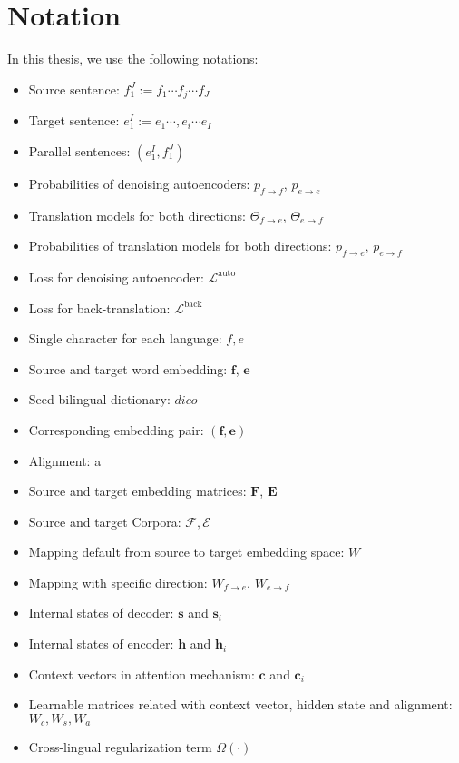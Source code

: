 \section{Notation}
In this thesis, we use the following notations:
\begin{itemize}
	\item Source sentence:  ${f_1^J:= f_1 \cdots  f_j \cdots f_J}$ 
	\item Target sentence:  ${e_1^I:= e_1 \cdots, e_i \cdots e_I}$
	\item Parallel sentences: $(e_1^I, f_1^J)$
	\item Probabilities of denoising autoencoders: $p_{f\rightarrow f}$, $p_{e\rightarrow e}$
	\item Translation models for both directions: $\Theta_{f\rightarrow e}$, $\Theta_{e \rightarrow f}$
	\item Probabilities of translation models for both directions: $p_{f\rightarrow e}$, $p_{e\rightarrow f}$
	\item Loss for denoising autoencoder: $\mathcal{L}^{\text{auto}}$
	\item Loss for back-translation: $\mathcal{L}^{\text{back}}$
	\item Single character for each language: $f,e$ 
	\item Source and target word embedding: $\bm{f}$, $\bm{e}$
	\item Seed bilingual dictionary: $dico$ 
	\item Corresponding embedding pair: $(\bm{f}, \bm{e})$
	\item Alignment: a
	\item Source and target embedding matrices: $\bm{F}$, $\bm{E}$
	\item Source and target Corpora: $\mathcal{F}, \mathcal{E}$
	\item Mapping default from source to target embedding space: $W$
	\item Mapping with specific direction: $W_{f\rightarrow e}$, $W_{e\rightarrow f}$
	\item Internal states of decoder: $\bm{s}$ and $\bm{s}_i$  
	\item Internal states of encoder: $\bm{h}$ and $\bm{h}_i$ 
	\item Context vectors in attention mechanism: $\bm{c}$ and $\bm{c}_i$ 
	\item Learnable matrices related with context vector, hidden state and alignment: $W_c, W_s, W_a$ 
	\item Cross-lingual regularization term $\Omega(\cdot)$

\end{itemize}
